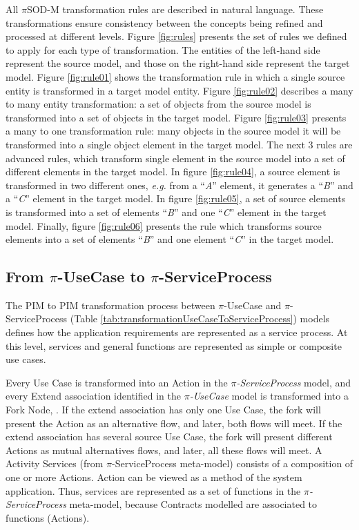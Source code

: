  All $\pi$SOD-M transformation rules are described in natural language.
 These transformations ensure consistency between the concepts being refined and
 processed at different levels. Figure \ref{fig:rules} presents the set of rules
we defined to apply for each type of transformation. The entities of the
left-hand side represent the source model, and those on the right-hand side
represent the target model. Figure \ref{fig:rule01} shows the transformation
rule in which a single source entity is transformed in a target model entity.
Figure \ref{fig:rule02} describes a many to many entity transformation: a set of
objects from the source model is transformed into a set of objects in the target
model. Figure \ref{fig:rule03} presents a many to one transformation rule: many
objects in the source model it will be transformed into a single object element
in the target model. The next 3 rules are advanced rules, which transform single element in the source model into a set of different elements
in the target model. In figure \ref{fig:rule04}, a source element is
transformed in two different ones, \textit{e.g.} from a ``\textit{A}'' element,
it generates a ``\textit{B}'' and a ``\textit{C}'' element in the target model.
In figure \ref{fig:rule05}, a set of source elements is
transformed into a set of elements ``\textit{B}'' and one ``\textit{C}'' element
in the target model. Finally, figure \ref{fig:rule06} presents the rule which
transforms source elements into a set of elements
``\textit{B}'' and one element ``\textit{C}'' in the target model.

\subsection{From $\pi$-UseCase to
$\pi$-ServiceProcess}

The PIM to PIM transformation process between $\pi$-UseCase and
$\pi$-ServiceProcess (Table \ref{tab:transformationUseCaseToServiceProcess})
models defines how the application requirements are represented as a service
process. At this level, services and general functions are represented as simple
or composite use cases.

Every {\sc Use Case} is transformed into
an {\sc Action} in the \textit{$\pi$-ServiceProcess} model, and every {\sc
Extend} association identified in the \textit{$\pi$-UseCase} model is
transformed into a {\sc Fork Node}, . If the extend
association has only one {\sc Use Case}, the fork will present the {\sc Action} as an alternative flow, and later, both flows will meet. If the extend association has several source
{\sc Use Case}, the fork will present different {\sc Actions} as mutual
alternatives flows, and later, all these flows will meet. A {\sc Activity
Services} (from $\pi$-ServiceProcess meta-model) consists of a composition of
one or more {\sc Actions}. {\sc Action} can be viewed as a method of
the system application. Thus, services are represented as a set of functions in
the \textit{$\pi$-ServiceProcess} meta-model, because {\sc Contracts} modelled
are associated to functions ({\sc Actions}).

